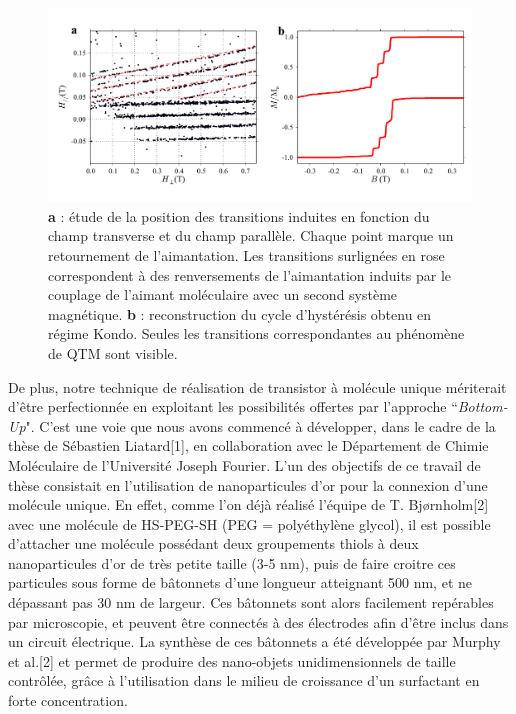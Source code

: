 \begin{figure}[h!]
\includegraphics[scale=0.45]{Conclusion/TranInd/TransInd.pdf} 
\caption{\textbf{a} : étude de la position des transitions induites en fonction du champ transverse et du champ parallèle. Chaque point marque un retournement de l'aimantation. Les transitions surlignées en rose correspondent à des renversements de l'aimantation induits par le couplage de l'aimant moléculaire avec un second système magnétique. \textbf{b} : reconstruction du cycle d'hystérésis obtenu en régime Kondo. Seules les transitions correspondantes au phénomène de QTM sont visible.}
\label{TransIndConcl}
\end{figure}


De plus, notre technique de réalisation de transistor à molécule unique mériterait d’être perfectionnée en exploitant les possibilités offertes par l’approche ``\textit{Bottom-Up}". C'est une voie que nous avons commencé à développer, dans le cadre de la thèse de Sébastien Liatard[1], en collaboration avec le Département de Chimie Moléculaire de l’Université Joseph Fourier. L’un des objectifs de ce travail de thèse consistait en l’utilisation de nanoparticules d'or pour la connexion d’une molécule unique. En effet, comme l'on déjà réalisé l'équipe de T. Bjørnholm[2] avec une molécule de HS-PEG-SH (PEG = polyéthylène glycol), il est possible d'attacher une molécule possédant deux groupements thiols à deux nanoparticules d'or de très petite taille (3-5 nm), puis de faire croitre ces particules sous forme de bâtonnets d'une longueur atteignant 500 nm, et ne dépassant pas 30 nm de largeur. Ces bâtonnets sont alors facilement repérables par microscopie, et peuvent être connectés à des électrodes afin d'être inclus dans un circuit électrique. La synthèse de ces bâtonnets a été développée par Murphy et al.[2] et permet de produire des nano-objets unidimensionnels de taille contrôlée, grâce à l'utilisation dans le milieu de croissance d'un surfactant en forte concentration. 

